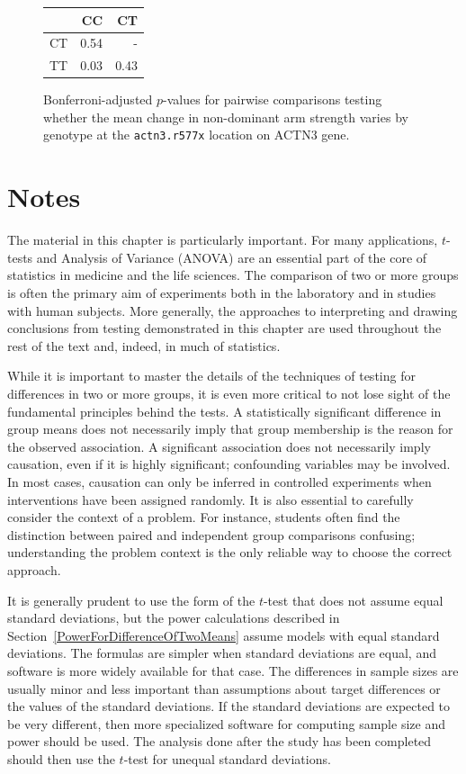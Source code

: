 \begin{figure}[ht]
	\centering
	\begin{tabular}{rrr}
		\hline
		& CC & CT \\ 
		\hline
		CT & 0.54 &  - \\ 
		TT & 0.03 & 0.43 \\ 
		\hline
	\end{tabular}
	\caption{Bonferroni-adjusted $p$-values for pairwise comparisons testing whether the mean change in non-dominant arm strength varies by genotype at the \texttt{actn3.r577x} location on ACTN3 gene.} 
	\label{posthocTestsForFamussAdjusted}
\end{figure}


\section{Notes}
\label{inferenceForNumericalDataNotes}


The material in this chapter is particularly important.  For many applications, $t$-tests and Analysis of Variance (ANOVA) are an essential part of the core of statistics in medicine and the life sciences.  The comparison of two or more groups is often the primary aim of experiments both in the laboratory and in studies with human subjects. More generally, the approaches to interpreting and drawing conclusions from testing demonstrated in this chapter are used throughout the rest of the text and, indeed, in much of statistics.  

While it is important to master the details of the techniques of testing for differences in two or more groups, it is even more critical to not lose sight of the fundamental principles behind the tests.  A statistically significant difference in group means does not necessarily imply that group membership is the reason for the observed association. A significant association does not necessarily imply causation, even if it is highly significant; confounding variables may be involved. In most cases, causation can only be inferred in controlled experiments when interventions have been assigned randomly. It is also essential to carefully consider the context of a problem. For instance, students often find the distinction between paired and independent group comparisons confusing; understanding the problem context is the only reliable way to choose the correct approach.

It is generally prudent to use the form of the $t$-test that does not assume equal standard deviations, but the power calculations described in Section~\ref{PowerForDifferenceOfTwoMeans} assume models with equal standard deviations.  The formulas are simpler when standard deviations are equal, and software is more widely available for that case.  The differences in sample sizes are usually minor and less important than assumptions about target differences or the values of the standard deviations.  If the standard deviations are expected to be very different, then more specialized software for computing sample size and power should be used. The analysis done after the study has been completed should then use the $t$-test for unequal standard deviations.

